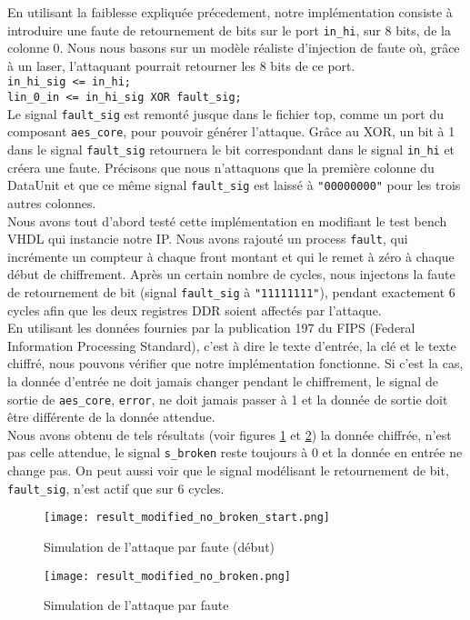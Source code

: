 En utilisant la faiblesse expliquée précedement, notre implémentation
consiste à introduire une faute de retournement de bits sur le port
\texttt{in\_hi}, sur 8 bits, de la colonne 0.
Nous nous basons sur un
modèle réaliste d'injection de faute où, grâce à un laser, l'attaquant
pourrait retourner les 8 bits de ce port.\\
\texttt{in\_hi\_sig <= in\_hi;\\  lin\_0\_in <= in\_hi\_sig XOR fault\_sig;} \\
Le signal \texttt{fault\_sig} est remonté jusque dans le fichier top, comme un
port du composant \texttt{aes\_core}, pour pouvoir générer l'attaque.
Grâce au XOR,
un bit à 1 dans le signal \texttt{fault\_sig} retournera le bit correspondant
dans le signal \texttt{in\_hi} et créera une faute.
Précisons que nous n'attaquons que la première colonne du DataUnit et que ce
même signal \texttt{fault\_sig} est laissé à \texttt{"00000000"} pour les trois
autres colonnes. \\
Nous avons tout d'abord testé cette implémentation en modifiant le test bench
VHDL qui instancie notre IP. Nous avons rajouté un process \texttt{fault},
qui incrémente un compteur à chaque front montant et qui le remet à zéro à
chaque début de chiffrement. Après un certain nombre de cycles, nous injectons
la faute de retournement de bit (signal \texttt{fault\_sig} à
\texttt{"11111111"}),
pendant exactement 6 cycles afin que les deux registres DDR soient affectés par
l'attaque. \\
En utilisant les données fournies par la publication 197 du FIPS (Federal
Information
Processing Standard), c'est à dire le texte d'entrée, la clé et le texte
chiffré,
nous pouvons vérifier que notre implémentation fonctionne. Si c'est la cas,
la donnée d'entrée ne doit jamais changer pendant le chiffrement, le signal
de sortie de \texttt{aes\_core}, \texttt{error}, ne doit jamais passer à 1 et
la donnée de sortie doit être différente de la donnée attendue. \\
Nous avons obtenu de tels résultats (voir figures \ref{modified_start} et
\ref{modified}) la donnée chiffrée, n'est pas celle attendue, le signal
\texttt{s\_broken} reste toujours à 0 et la donnée en entrée ne change pas. On
peut
aussi voir que le signal modélisant le retournement de bit, \texttt{fault\_sig},
n'est actif que sur 6 cycles.
\begin{figure}[htbp]
	\begin{center}
		\texttt{[image: result\_modified\_no\_broken\_start.png]}
		\caption{Simulation de l'attaque par faute (début)}
		\label{modified_start}
	\end{center}
\end{figure}
\begin{figure}[htbp]
	\begin{center}
	\texttt{[image: result\_modified\_no\_broken.png]}
	\caption{Simulation de l'attaque par faute}
	\label{modified}
	\end{center}
\end{figure}

